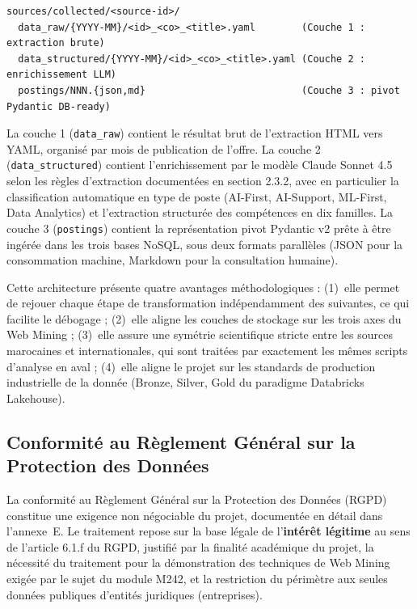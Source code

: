 \documentclass[11pt,a4paper,openany]{report}
\begin{document}
\begin{lstlisting}[language={},numbers=none,caption={Arborescence en trois couches uniforme}]
sources/collected/<source-id>/
  data_raw/{YYYY-MM}/<id>_<co>_<title>.yaml        (Couche 1 : extraction brute)
  data_structured/{YYYY-MM}/<id>_<co>_<title>.yaml (Couche 2 : enrichissement LLM)
  postings/NNN.{json,md}                           (Couche 3 : pivot Pydantic DB-ready)
\end{lstlisting}

La couche 1 (\texttt{data\_raw}) contient le r\'esultat brut de l'extraction HTML vers YAML, organis\'e par mois de publication de l'offre. La couche 2 (\texttt{data\_structured}) contient l'enrichissement par le mod\`ele Claude Sonnet 4.5 selon les r\`egles d'extraction document\'ees en section 2.3.2, avec en particulier la classification automatique en type de poste (AI-First, AI-Support, ML-First, Data Analytics) et l'extraction structur\'ee des comp\'etences en dix familles. La couche 3 (\texttt{postings}) contient la repr\'esentation pivot Pydantic v2 pr\^ete \`a \^etre ing\'er\'ee dans les trois bases NoSQL, sous deux formats parall\`eles (JSON pour la consommation machine, Markdown pour la consultation humaine).

Cette architecture pr\'esente quatre avantages m\'ethodologiques : (1)~elle permet de rejouer chaque \'etape de transformation ind\'ependamment des suivantes, ce qui facilite le d\'ebogage ; (2)~elle aligne les couches de stockage sur les trois axes du Web Mining ; (3)~elle assure une sym\'etrie scientifique stricte entre les sources marocaines et internationales, qui sont trait\'ees par exactement les m\^emes scripts d'analyse en aval ; (4)~elle aligne le projet sur les standards de production industrielle de la donn\'ee (Bronze, Silver, Gold du paradigme Databricks Lakehouse).

\subsection{Conformit\'e au R\`eglement G\'en\'eral sur la Protection des Donn\'ees}

La conformit\'e au R\`eglement G\'en\'eral sur la Protection des Donn\'ees (RGPD) constitue une exigence non n\'egociable du projet, document\'ee en d\'etail dans l'annexe~E. Le traitement repose sur la base l\'egale de l'\textbf{int\'er\^et l\'egitime} au sens de l'article 6.1.f du RGPD, justifi\'e par la finalit\'e acad\'emique du projet, la n\'ecessit\'e du traitement pour la d\'emonstration des techniques de Web Mining exig\'ee par le sujet du module M242, et la restriction du p\'erim\`etre aux seules donn\'ees publiques d'entit\'es juridiques (entreprises).
\end{document}
